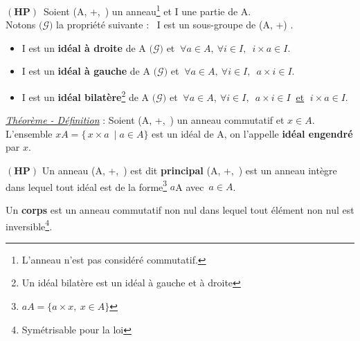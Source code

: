 \(\left(\mathbf{HP}\right)\,\) Soient (A, +,\ \x) un anneau\footnote{L'anneau n'est pas considéré commutatif.} et I une partie de A.\vspace{0.1cm}\\
Notons \(\bigl(\mathscr{G}\bigr)\) la propriété suivante : \guillemetleft\, I est un sous-groupe de (A, +) \guillemetright.\vspace{0.25cm}
\begin{itemize}[leftmargin=0.3cm,label=•]
    \item I est un \textbf{idéal à droite} de A \ssi \(\bigl(\mathscr{G}\bigr)\) et \(\ \forall a\in A,\ \forall i\in I, \ \; i\times a \in I.\)
    
    \item I est un \textbf{idéal à gauche} de A \ssi \(\bigl(\mathscr{G}\bigr)\) et \(\ \forall a\in A,\ \forall i\in I, \ \; a\times i \in I.\)
    
    \item I est un \textbf{idéal bilatère}\footnote{Un idéal bilatère est un idéal à gauche et à droite} de A \ssi \(\bigl(\mathscr{G}\bigr)\) et \(\ \forall a\in A,\ \forall i\in I,\ \; a\times i \in I\ \) \underline{et} \(\; i\times a \in I.\)
\end{itemize}

\vspace{1cm}


\underline{\emph{Théorème - Définition}} : Soient (A, +,\ \x) un anneau commutatif et $x \in A$.\\
L'ensemble \( xA = \{\, x\times a \ \mid a\in A \}\) est un idéal de A, on l'appelle \textbf{idéal engendré} par $x$.

\vspace{1cm}

\(\left(\mathbf{HP}\right)\) Un anneau (A, +,\ \x) est dit \textbf{principal} \ssi (A, +,\ \x) est un anneau intègre dans lequel tout idéal est de la forme\footnote{\(aA=\{a\times x,\ x\in A\}\)} $a$A avec $\,a\in \!A$.

\vspace{1.2cm}

\noindent Un \textbf{corps} est un anneau commutatif non nul dans lequel tout élément non nul est inversible\footnote{Symétrisable pour la loi \x}.

\vspace{1cm}

